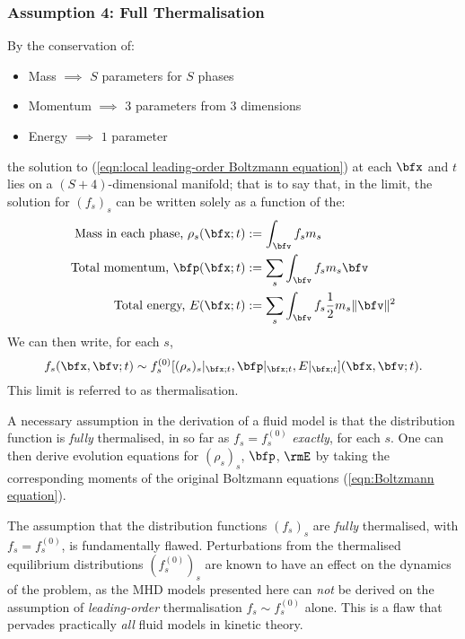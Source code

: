 \subsubsection*{Assumption 4: Full Thermalisation}
    By the conservation of:
    \begin{itemize}
        \item  Mass $\implies$ $S$ parameters for $S$ phases
        \item  Momentum $\implies$ $3$ parameters from $3$ dimensions
        \item  Energy $\implies$ $1$ parameter
    \end{itemize}
    the solution to (\ref{eqn:local leading-order Boltzmann equation}) at each $\bfx$ and $t$ lies on a $(S + 4)$-dimensional manifold; that is to say that, in the limit, the solution for $(f_{s})_{s}$ can be written solely as a function of the:
    \begin{align}
        \text{Mass in each phase, }  \rho_{s}(\bfx; t)  &:=  \int_{\bfv}f_{s}m_{s}  \\
        \text{Total momentum, }  \bfp(\bfx; t)  &:=  \sum_{s}\int_{\bfv}f_{s}m_{s}\bfv  \\
        \text{Total energy, }  E(\bfx; t)  &:=  \sum_{s}\int_{\bfv}f_{s}\frac{1}{2}m_{s}\|\bfv\|^{2}
    \end{align}
    We can then write, for each $s$,
    \begin{equation}
        f_{s}(\bfx, \bfv; t)  \sim  f_{s}^{(0)}[(\rho_{s})_{s}|_{\bfx; t}, \bfp|_{\bfx; t}, E|_{\bfx; t}](\bfx, \bfv; t).
    \end{equation}
    This limit is referred to as thermalisation.
    
    A necessary assumption in the derivation of a fluid model is that the distribution function is \emph{fully} thermalised, in so far as $f_{s}  =  f_{s}^{(0)}$ \emph{exactly}, for each $s$. One can then derive evolution equations for $(\rho_{s})_{s}$, $\bfp$, $\rmE$ by taking the corresponding moments of the original Boltzmann equations (\ref{eqn:Boltzmann equation}).

    \begin{remark}
        The assumption that the distribution functions $(f_{s})_{s}$ are \emph{fully} thermalised, with $f_{s}  =  f_{s}^{(0)}$, is fundamentally flawed. Perturbations from the thermalised equilibrium distributions $(f_{s}^{(0)})_{s}$ are known to have an effect on the dynamics of the problem, as the MHD models presented here can \emph{not} be derived on the assumption of \emph{leading-order} thermalisation $f_{s}  \sim  f_{s}^{(0)}$ alone. \BA{[Ref]} This is a flaw that pervades practically \emph{all} fluid models in kinetic theory.
    \end{remark}

